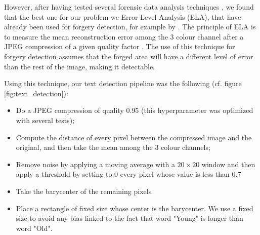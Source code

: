 \documentclass[sigconf, nonacm]{acmart}
\begin{document}
However, after having tested several forensic data analysis techniques \cite{meyer_forensische_2012}, we found that the best one for our problem we Error Level Analysis (ELA), that have already been used for forgery detection, for example by \cite{sudiatmika_image_2018}. The principle of ELA is to measure the mean reconstruction error among the 3 colour channel after a JPEG compression of a given quality factor \cite{skodras_jpeg_2001}. The use of this technique for forgery detection assumes that the forged area will have a different level of error than the rest of the image, making it detectable.

Using this technique, our text detection pipeline was the following (cf. figure \ref{fig:text_detection}):
\begin{itemize}
    \item Do a JPEG compression of quality 0.95 (this hyperparameter was optimized with several tests);
    \item Compute the distance of every pixel between the compressed image and the original, and then take the mean among the 3 colour channels;
    \item Remove noise by applying a moving average with a $20\times20$ window and then apply a threshold by setting to $0$ every pixel whose value is less than $0.7$
    \item Take the barycenter of the remaining pixels
    \item Place a rectangle of fixed size whose center is the barycenter. We use a fixed size to avoid any bias linked to the fact that word "Young" is longer than word "Old".
\end{itemize}
\end{document}
